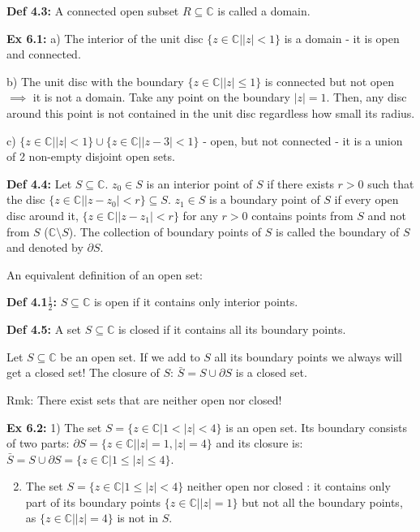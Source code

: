 \documentclass{article}
\begin{document}
\textbf{Def 4.3:} A connected open subset $R \subseteq \mathbb{C}$ is called a domain.

\textbf{Ex 6.1:} a) The interior of the unit disc $\{z \in \mathbb{C} | |z| < 1\}$ is a domain - it is open and connected.

b) The unit disc with the boundary $\{z \in \mathbb{C} | |z| \leq 1\}$ is connected but not open $\implies$ it is not a domain. Take any point on the boundary $|z| = 1$. Then, any disc around this point is not contained in the unit disc regardless how small its radius.

c) $\{z \in \mathbb{C} | |z| < 1\} \cup \{z \in \mathbb{C} | |z - 3| < 1\}$ - open, but not connected - it is a union of 2 non-empty disjoint open sets.

\textbf{Def 4.4:} Let $S \subseteq \mathbb{C}$. $z_0 \in S$ is an interior point of $S$ if there exists $r > 0$ such that the disc $\{z \in \mathbb{C} | |z - z_0| < r\} \subseteq S$. $z_1 \in S$ is a boundary point of $S$ if every open disc around it, $\{z \in \mathbb{C} | |z - z_1| < r\}$ for any $r > 0$ contains points from $S$ and not from $S$ ($\mathbb{C} \setminus S$). The collection of boundary points of $S$ is called the boundary of $S$ and denoted by $\partial S$.

An equivalent definition of an open set:

\textbf{Def 4.1$\frac{1}{2}$:} $S \subseteq \mathbb{C}$ is open if it contains only interior points.

\textbf{Def 4.5:} A set $S \subseteq \mathbb{C}$ is closed if it contains all its boundary points.

Let $S \subseteq \mathbb{C}$ be an open set. If we add to $S$ all its boundary points we always will get a closed set! The closure of $S$: $\bar{S} = S \cup \partial S$ is a closed set.

Rmk: There exist sets that are neither open nor closed!

\textbf{Ex 6.2:} 1) The set $S = \{z \in \mathbb{C} | 1 < |z| < 4\}$ is an open set. Its boundary consists of two parts: $\partial S = \{z \in \mathbb{C} | |z| = 1, |z| = 4\}$ and its closure is: $\bar{S} = S \cup \partial S = \{z \in \mathbb{C} | 1 \leq |z| \leq 4\}$.

\begin{enumerate}
    \setcounter{enumi}{1}
    \item The set $S = \{z \in \mathbb{C} | 1 \leq |z| < 4\}$ neither open nor closed : it contains only part of its boundary points $\{z \in \mathbb{C} | |z| = 1\}$ but not all the boundary points, as $\{z \in \mathbb{C} | |z| = 4\}$ is not in $S$.
\end{enumerate}
\end{document}
